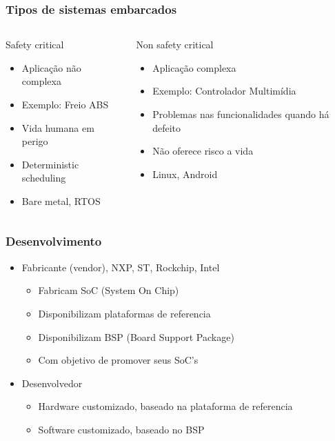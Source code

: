 \documentclass{beamer}
\begin{document}
\begin{frame}
  \frametitle{Tipos de sistemas embarcados}
  \begin{columns}
    \begin{block}{Safety critical}
     \begin{itemize}
      \item Aplicação não complexa
      \item Exemplo: Freio ABS
      \item Vida humana em perigo
      \item Deterministic scheduling
      \item Bare metal, RTOS
      \end{itemize}
    \end{block}
    \begin{block}{Non safety critical}
      \begin{itemize}
      \item Aplicação complexa
      \item Exemplo: Controlador Multimídia
      \item Problemas nas funcionalidades quando há defeito
      \item Não oferece risco a vida
      \item Linux, Android  
      \end{itemize}
    \end{block}
  \end{columns}
\end{frame}


\begin{frame}
  \frametitle{Desenvolvimento}
  \begin{itemize}
  \item Fabricante (vendor), NXP, ST, Rockchip, Intel
    \begin{itemize}
    \item Fabricam SoC (System On Chip)
    \item Disponibilizam plataformas de referencia
    \item Disponibilizam BSP (Board Support Package)
    \item Com objetivo de promover seus SoC's
    \end{itemize}
  \item Desenvolvedor
    \begin{itemize}
    \item Hardware customizado, baseado na plataforma de referencia
    \item Software customizado, baseado no BSP
    \end{itemize}
  \end{itemize}
\end{frame}
\end{document}
